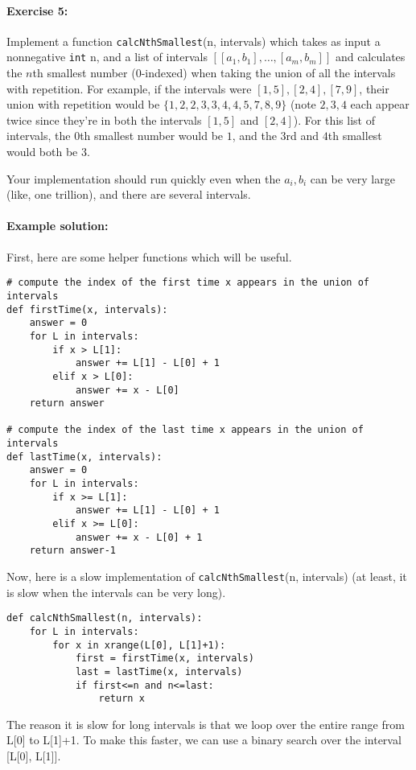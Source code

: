 \documentclass[11pt]{article}
\begin{document}
\paragraph{Exercise 5:}
Implement a function \texttt{calcNthSmallest}(n, intervals) which
takes as
input a nonnegative \texttt{int} n, and a list of intervals
$[[a_1,b_1],\ldots,[a_m,b_m]]$ and
calculates the $n$th smallest number (0-indexed) when taking the union
of all the intervals with repetition.  For example, if the intervals
were $[1,5],[2,4],[7,9]$, their union with repetition would be
$\{1,2,2,3,3,4,4,5,7,8,9\}$ (note $2,3,4$ each appear twice since
they're in both the intervals $[1,5]$ and $[2,4]$).  For this list of
intervals, the $0$th smallest number would be $1$, and the $3$rd and
$4$th smallest would both be $3$.

Your implementation should run quickly even when the $a_i,b_i$ can be
very large (like, one trillion), and there are several
intervals. 

\paragraph{Example solution:}
First, here are some helper functions which will be useful.
\begin{verbatim}
# compute the index of the first time x appears in the union of intervals
def firstTime(x, intervals):
    answer = 0
    for L in intervals:
        if x > L[1]:
            answer += L[1] - L[0] + 1
        elif x > L[0]:
            answer += x - L[0]
    return answer

# compute the index of the last time x appears in the union of intervals
def lastTime(x, intervals):
    answer = 0
    for L in intervals:
        if x >= L[1]:
            answer += L[1] - L[0] + 1
        elif x >= L[0]:
            answer += x - L[0] + 1
    return answer-1
\end{verbatim}

Now, here is a slow implementation of \texttt{calcNthSmallest}(n,
intervals) (at least, it is slow when the intervals can be very long).

\begin{verbatim}
def calcNthSmallest(n, intervals):
    for L in intervals:
        for x in xrange(L[0], L[1]+1):
            first = firstTime(x, intervals)
            last = lastTime(x, intervals)
            if first<=n and n<=last:
                return x
\end{verbatim}

The reason it is slow for long intervals is that we loop over the
entire range
from L[0] to L[1]+1.  To make this faster, we can use a binary
search over the interval [L[0], L[1]].
\end{document}
